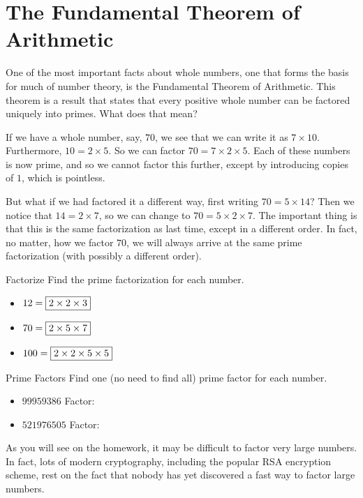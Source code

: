 \documentclass[a4paper,10pt]{report}
\begin{document}
\section{The Fundamental Theorem of Arithmetic}

One of the most important facts about whole numbers, one that forms the basis
for much of number theory, is the Fundamental Theorem of Arithmetic. This
theorem is a result that states that every positive whole number can be factored
uniquely into primes. What does that mean?

If we have a whole number, say, $70$, we see that we can write it as
$7\times10$. Furthermore, $10=2\times5$. So we can factor $70=7\times2\times5$.
Each of these numbers is now prime, and so we cannot factor this further, except
by introducing copies of $1$, which is pointless.

But what if we had factored it a different way, first writing $70=5\times14$?
Then we notice that $14=2\times7$, so we can change to $70=5\times2\times7$. The
important thing is that this is the same factorization as last time, except in a
different order. In fact, no matter, how we factor $70$, we will always arrive
at the same prime factorization (with possibly a different order).

\begin{problem}{Factorize}
 Find the prime factorization for each number.

 \begin{itemize}
  \item $12 = \Ans{2\times2\times3}$
  \item $70 = \Ans{2\times5\times7}$
  \item $100 = \Ans{2\times2\times5\times5}$
 \end{itemize}
\end{problem}

\begin{problem}{Prime Factors}
 Find one (no need to find all) prime factor for each number.

 \begin{itemize}
  \item $99959386$ \hfill Factor: 
  \item $521976505$ \hfill Factor: 
 \end{itemize}
\end{problem}

As you will see on the homework, it may be difficult to factor very large
numbers. In fact, lots of modern cryptography, including the popular RSA
encryption scheme, rest on the fact that nobody has yet discovered a fast way to
factor large numbers.
\end{document}
